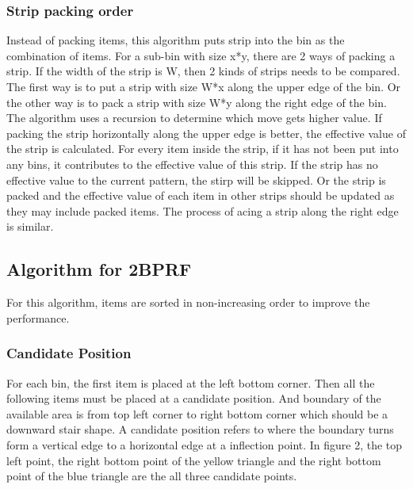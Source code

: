 \documentclass[11pt]{article}
\begin{document}
        \subsubsection{Strip packing order}
        Instead of packing items, this algorithm puts strip into the bin as the combination of items. For a sub-bin with size x*y, there are 2 ways of packing a strip. If the width of the strip is W, then 2 kinds of strips needs to be compared. The first way is to put a strip with size W*x along the upper edge of the bin. Or the other way is to pack a strip with size W*y along the right edge of the bin. The algorithm uses a recursion to determine which move gets higher value.
        \newline
        If packing the strip horizontally along the upper edge is better, the effective value of the strip is calculated. For every item inside the strip, if it has not been put into any bins, it contributes to the effective value of this strip. If the strip has no effective value to the current pattern, the stirp will be skipped. Or the strip is packed and the effective value of each item in other strips should be updated as they may include packed items. The process of acing a strip along the right edge is similar.
    \subsection{Algorithm for 2BPRF}
    For this algorithm, items are sorted in non-increasing order to improve the performance.
        \subsubsection{Candidate Position}
        For each bin, the first item is placed at the left bottom corner. Then all the following items must be placed at a candidate position. And boundary of the available area is from top left corner to right bottom corner which should be a downward stair shape. A candidate position refers to where the boundary turns form a vertical edge to a horizontal edge at a inflection point. In figure 2, the top left point, the right bottom point of the yellow triangle and the right bottom point of the blue triangle are the all three candidate points.
\end{document}
